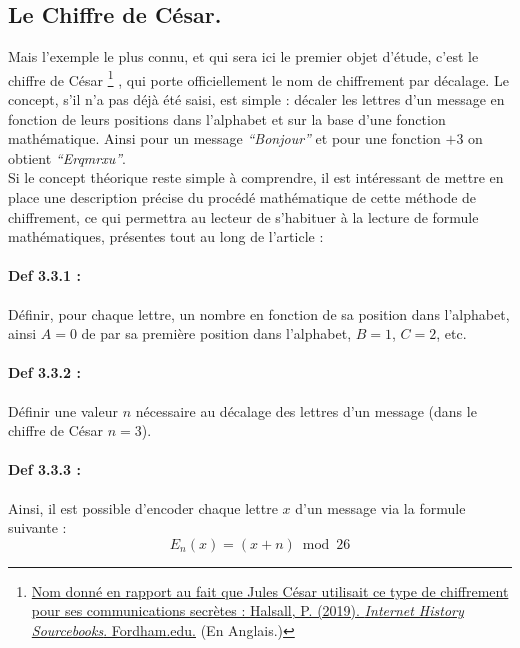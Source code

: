 \documentclass{article}
\begin{document}
\clearpage

\subsection{Le Chiffre de César.}\label{le-chiffre-de-cesar.}

Mais l'exemple le plus connu, et qui sera ici le premier objet d'étude, c'est le chiffre de César \footnote{\href{https://sourcebooks.fordham.edu/ancient/suetonius-julius.asp}{Nom donné en rapport au fait que Jules César utilisait ce type de chiffrement pour ses communications secrètes : Halsall, P. (2019). \textit{Internet History Sourcebooks}. Fordham.edu.} (En Anglais.)}
, qui porte officiellement le nom de chiffrement par décalage. Le concept, s'il n'a pas déjà été saisi, est simple : décaler les lettres d'un message en fonction de leurs positions dans l'alphabet et sur la base d'une fonction mathématique. Ainsi pour un message \textit{``Bonjour''} et pour une fonction \(+3\) on obtient \textit{``Erqmrxu''}.\\ 

Si le concept théorique reste simple à comprendre, il est intéressant de mettre en place une description précise du procédé mathématique de cette méthode de chiffrement, ce qui permettra au lecteur de s'habituer à la lecture de formule mathématiques, présentes tout au long de l'article :

\paragraph{Def 3.3.1 :}\label{def-3.3.1}

Définir, pour chaque lettre,
un nombre en fonction de sa position dans l'alphabet, ainsi \(A = 0\) de
par sa première position dans l'alphabet, \(B = 1\), \(C = 2\), etc.

\paragraph{Def 3.3.2 :}\label{def-3.3.2}

Définir une valeur \(n\) nécessaire au décalage des lettres d'un message
(dans le chiffre de César \(n=3\)).

\paragraph{Def 3.3.3 :}\label{def-3.3.3}

Ainsi, il est possible d'encoder chaque lettre \(x\) d'un message via la
formule suivante : \[
E_n(x)=(x+n)\bmod26
\] 
\end{document}

